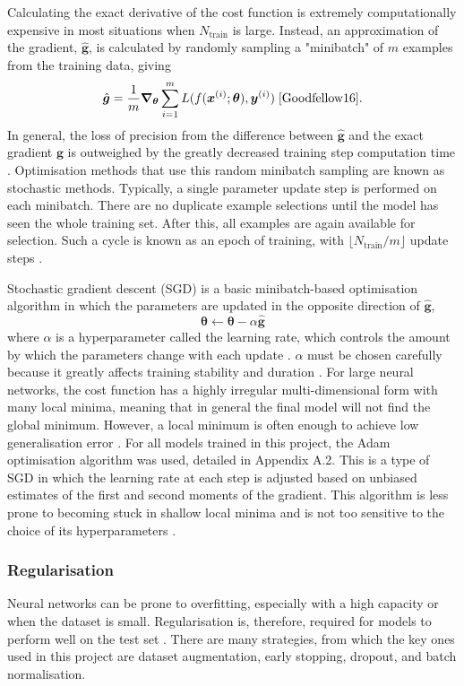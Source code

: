 \documentclass[12pt]{article}
\begin{document}
Calculating the exact derivative of the cost function is extremely computationally expensive in most situations when $N_{\mathrm{train}}$ is large. Instead, an approximation of the gradient, $\hat{\bm{g}}$, is calculated by randomly sampling a "minibatch" of $m$ examples from the training data, giving
\begin{equation}
\label{BatchGrad}
\hat{\bm{g}}=\frac{1}{m}\bm\nabla_{\bm\theta}\sum_{i=1}^mL(f(\bm{x}^{(i)};\bm\theta),\bm{y}^{(i)})\;\cite{Goodfellow16}.
\end{equation}
In general, the loss of precision from the difference between $\hat{\bm{g}}$ and the exact gradient $\bm{g}$ is outweighed by the greatly decreased training step computation time \cite{Goodfellow16}. Optimisation methods that use this random minibatch sampling are known as stochastic methods. Typically, a single parameter update step is performed on each minibatch. There are no duplicate example selections until the model has seen the whole training set. After this, all examples are again available for selection. Such a cycle is known as an epoch of training, with $\lfloor N_{\mathrm{train}}/m\rfloor$ update steps \cite{Goodfellow16}.

Stochastic gradient descent (SGD) is a basic minibatch-based optimisation algorithm in which the parameters are updated in the opposite direction of $\hat{\bm{g}}$,
\begin{equation}
\bm\theta\leftarrow\bm\theta-\alpha\hat{\bm{g}}
\end{equation}
where $\alpha$ is a hyperparameter called the learning rate, which controls the amount by which the parameters change with each update \cite{Amari93}. $\alpha$ must be chosen carefully because it greatly affects training stability and duration \cite{Goodfellow16}. For large neural networks, the cost function has a highly irregular multi-dimensional form with many local minima, meaning that in general the final model will not find the global minimum. However, a local minimum is often enough to achieve low generalisation error \cite{Goodfellow16}. For all models trained in this project, the Adam optimisation algorithm was used, detailed in Appendix A.2. This is a type of SGD in which the learning rate at each step is adjusted based on unbiased estimates of the first and second moments of the gradient. This algorithm is less prone to becoming stuck in shallow local minima and is not too sensitive to the choice of its hyperparameters \cite{Kingma14}. 

\subsubsection{Regularisation}
Neural networks can be prone to overfitting, especially with a high capacity or when the dataset is small. Regularisation is, therefore, required for models to perform well on the test set \cite{Goodfellow16}. There are many strategies, from which the key ones used in this project are dataset augmentation, early stopping, dropout, and batch normalisation.
\end{document}
